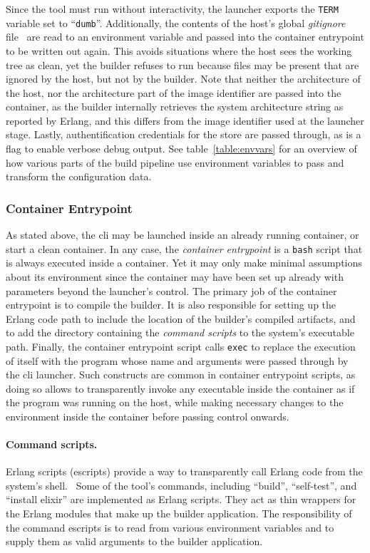 Since the tool must run without interactivity, the launcher exports the \lstinline|TERM| variable set to ``\lstinline|dumb|''. Additionally, the contents of the host's global \emph{gitignore} file~\cite{man:git} are read to an environment variable and passed into the container entrypoint to be written out again. This avoids situations where the host sees the working tree as clean, yet the builder refuses to run because files may be present that are ignored by the host, but not by the builder. Note that neither the architecture of the host, nor the architecture part of the image identifier are passed into the container, as the builder internally retrieves the system architecture string as reported by Erlang, and this differs from the image identifier used at the launcher stage. Lastly, authentification credentials for the store are passed through, as is a flag to enable verbose debug output. See table~\ref{table:envvars} for an overview of how various parts of the build pipeline use environment variables to pass and transform the configuration data.

\cleardoublepage
\subsubsection{Container Entrypoint}

As stated above, the \acrshort{cli} may be launched inside an already running container, or start a clean container. In any case, the \emph{container entrypoint} is a \lstinline|bash| script that is always executed inside a container. Yet it may only make minimal assumptions about its environment since the container may have been set up already with parameters beyond the launcher's control. The primary job of the container entrypoint is to compile the builder. It is also responsible for setting up the Erlang code path to include the location of the builder's compiled artifacts, and to add the directory containing the \emph{command scripts} to the system's executable path. Finally, the container entrypoint script calls \lstinline|exec| to replace the execution of itself with the program whose name and arguments were passed through by the \acrshort{cli} launcher. Such constructs are common in container entrypoint scripts, as doing so allows to transparently invoke any executable inside the container as if the program was running on the host, while making necessary changes to the environment inside the container before passing control onwards.

\paragraph{Command scripts.} Erlang scripts (escripts) provide a way to transparently call Erlang code from the system's shell.~\cite{doc:otp} Some of the tool's commands, including ``build'', ``self-test'', and ``install elixir'' are implemented as Erlang scripts. They act as thin wrappers for the Erlang modules that make up the builder application. The responsibility of the command escripts is to read from various environment variables and to supply them as valid arguments to the builder application.

